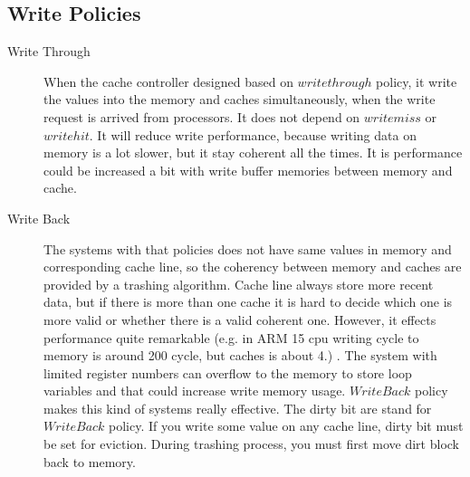 \subsection*{Write Policies }
\begin{description}
\item[Write Through] When the cache controller designed based on $write through$ policy, it write the values into the memory and caches simultaneously, when the write request is arrived from processors. It does not depend on $write miss$ or $write hit$. It will reduce write performance, because writing data on memory is a lot slower, but it stay coherent all the times. It is performance could be increased a bit  with write buffer memories between memory and cache.
\item[Write Back] The systems with that policies does not have same values in memory and corresponding cache line, so the coherency between memory and caches are provided by a trashing algorithm. Cache line always store more recent data, but if there is more than one cache it is hard to decide which one is more valid or whether there is a valid coherent one.  However, it effects performance quite remarkable (e.g. in ARM 15 cpu writing cycle to memory is around 200 cycle, but caches is about 4.) . The system with limited register numbers can overflow to the memory to store loop variables and that could increase write memory usage. $Write Back$ policy makes this kind of systems really effective. The dirty bit are stand for $WriteBack$ policy. If you write some value on any cache line, dirty bit must be set for eviction. During trashing process, you must first move dirt block back to memory. 
\end{description}
